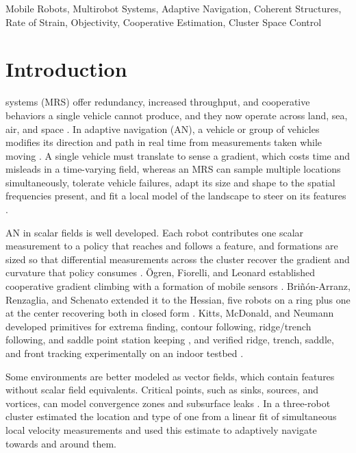 \documentclass[lettersize,journal]{IEEEtran}
\begin{document}
\begin{IEEEkeywords}
Mobile Robots, Multirobot Systems, Adaptive Navigation, Coherent
Structures, Rate of Strain, Objectivity, Cooperative Estimation,
Cluster Space Control
\end{IEEEkeywords}

\section{Introduction}

 systems (MRS) offer redundancy, increased
throughput, and cooperative behaviors a single vehicle cannot produce,
and they now operate across land, sea, air, and space \cite{1,2}.
 In adaptive
navigation (AN), a vehicle or group of vehicles modifies its direction and path in real time
from measurements taken while moving \cite{3}. A single vehicle must translate to sense a
gradient, which costs time and misleads in a time-varying field,
whereas an MRS can sample multiple locations simultaneously, tolerate
vehicle failures, adapt its size and shape to the spatial frequencies
present, and fit a local model of the landscape to steer on its features
\cite{3,4,5}.

AN in scalar fields is well developed. Each
robot contributes one scalar measurement to a policy that reaches and
follows a feature, and formations are sized so that differential
measurements across the cluster recover the gradient and curvature that
policy consumes \cite{5,6}. \"{O}gren, Fiorelli, and Leonard
established cooperative gradient climbing with a formation of mobile
sensors \cite{6}. Bri\~{n}\'{o}n-Arranz, Renzaglia, and Schenato
extended it to the Hessian, five robots on a ring plus one at the
center recovering both in closed form \cite{5}. Kitts, McDonald, and
Neumann developed primitives for extrema finding, contour following,
ridge/trench following, and saddle point station keeping \cite{3}, and
verified ridge, trench, saddle, and front tracking experimentally on an
indoor testbed \cite{4,7}.

Some environments are better modeled as vector fields, which contain features without scalar field equivalents. Critical points, such as sinks, sources, and vortices, can model convergence zones \cite{8} and subsurface leaks \cite{9}.  In \cite{10} a three-robot cluster
estimated the location and type of one from a linear fit of
simultaneous local velocity measurements and used this estimate to adaptively navigate towards and around them. 
\end{document}
